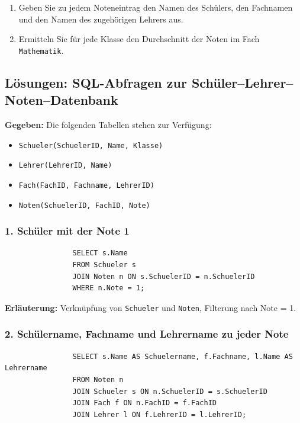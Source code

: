 \documentclass[a4paper,12pt]{article}
\begin{document}
\begin{enumerate}
\begin{enumerate}
				\item Geben Sie zu jedem Noteneintrag den Namen des Schülers, den Fachnamen und den Namen des zugehörigen Lehrers aus.
				
				\item Ermitteln Sie für jede Klasse den Durchschnitt der Noten im Fach \texttt{Mathematik}.
			\end{enumerate}
			\subsection*{Lösungen: SQL-Abfragen zur Schüler–Lehrer–Noten–Datenbank}
			
			\textbf{Gegeben:}  
			Die folgenden Tabellen stehen zur Verfügung:
			
			\begin{itemize}
				\item \texttt{Schueler(SchuelerID, Name, Klasse)}
				\item \texttt{Lehrer(LehrerID, Name)}
				\item \texttt{Fach(FachID, Fachname, LehrerID)}
				\item \texttt{Noten(SchuelerID, FachID, Note)}
			\end{itemize}
			
			\subsubsection*{1. Schüler mit der Note 1}
			
			\begin{verbatim}
				SELECT s.Name
				FROM Schueler s
				JOIN Noten n ON s.SchuelerID = n.SchuelerID
				WHERE n.Note = 1;
			\end{verbatim}
			
			\textbf{Erläuterung:}  
			Verknüpfung von \texttt{Schueler} und \texttt{Noten}, Filterung nach Note = 1.
			
			\vspace{1em}
			
			\subsubsection*{2. Schülername, Fachname und Lehrername zu jeder Note}
			
			\begin{verbatim}
				SELECT s.Name AS Schuelername, f.Fachname, l.Name AS Lehrername
				FROM Noten n
				JOIN Schueler s ON n.SchuelerID = s.SchuelerID
				JOIN Fach f ON n.FachID = f.FachID
				JOIN Lehrer l ON f.LehrerID = l.LehrerID;
			\end{verbatim}
			

\end{enumerate}
\end{document}
